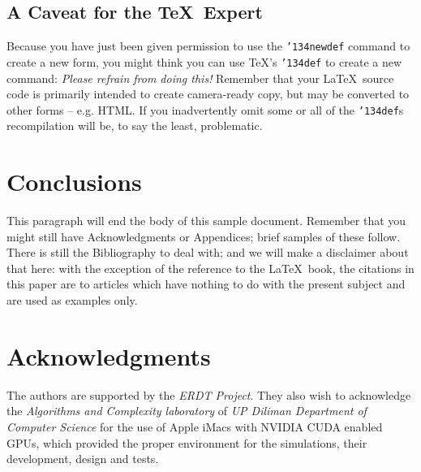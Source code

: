\documentclass{acm_proc_article-sp}
\begin{document}
\subsection*{A {\secit Caveat} for the \TeX\ Expert}
Because you have just been given permission to
use the \texttt{{\char'134}newdef} command to create a
new form, you might think you can
use \TeX's \texttt{{\char'134}def} to create a
new command: \textit{Please refrain from doing this!}
Remember that your \LaTeX\ source code is primarily intended
to create camera-ready copy, but may be converted
to other forms -- e.g. HTML. If you inadvertently omit
some or all of the \texttt{{\char'134}def}s recompilation will
be, to say the least, problematic.

\section{Conclusions}
This paragraph will end the body of this sample document.
Remember that you might still have Acknowledgments or
Appendices; brief samples of these
follow.  There is still the Bibliography to deal with; and
we will make a disclaimer about that here: with the exception
of the reference to the \LaTeX\ book, the citations in
this paper are to articles which have nothing to
do with the present subject and are used as
examples only.

\section{ Acknowledgments }
The authors are supported by the \textit{ERDT Project}. They also wish to acknowledge the \textit{Algorithms and Complexity laboratory} of \textit{UP Diliman Department of Computer Science} for the use of Apple iMacs with NVIDIA CUDA enabled GPUs, which provided the proper environment for the simulations, their development, design and tests.


%
%
\end{document}
